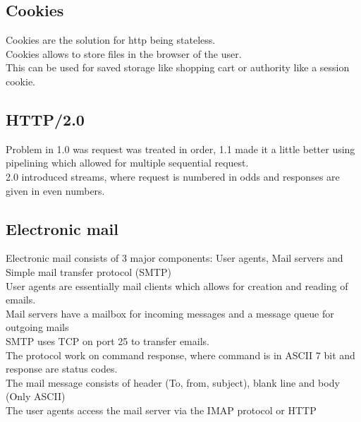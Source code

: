 \documentclass[12pt, a4paper]{article}
\begin{document}
		\subsection{Cookies}
			Cookies are the solution for http being stateless.\\
			Cookies allows to store files in the browser of the user.\\
			This can be used for saved storage like shopping cart or authority like a session cookie.\\
		\subsection{HTTP/2.0}
			Problem in 1.0 was request was treated in order, 1.1 made it a little better using pipelining which allowed for multiple sequential request.\\
			2.0 introduced streams, where request is numbered in odds and responses are given in even numbers.\\
		\subsection{Electronic mail}
			Electronic mail consists of 3 major components: User agents, Mail servers and Simple mail transfer protocol (SMTP)\\
			User agents are essentially mail clients which allows for creation and reading of emails.\\
			Mail servers have a mailbox for incoming messages and a message queue for outgoing mails\\
			SMTP uses TCP on port 25 to transfer emails.\\
			The protocol work on command response, where command is in ASCII 7 bit and response are status codes.\\
			The mail message consists of header (To, from, subject), blank line and body (Only ASCII)\\
			The user agents access the mail server via the IMAP protocol or HTTP\\
\end{document}
